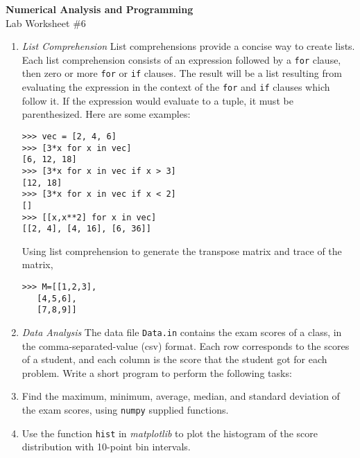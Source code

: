 \documentclass[12pt]{article}
\begin{document}
\begin{center}
\Large
\textbf{Numerical Analysis and Programming}\\
\large
Lab Worksheet \#6
\end{center}
\begin{enumerate}
\item \textit{List Comprehension}
List comprehensions provide a concise way to create lists. Each list comprehension consists of an expression followed by a  {\tt for} clause, then zero or more {\tt for} or {\tt if} clauses. The result will be a list resulting from evaluating the expression in the context of the  {\tt for} and {\tt if}  clauses which follow it. If the expression would evaluate to a tuple, it must be parenthesized. Here are some examples:
\small
\begin{verbatim}
>>> vec = [2, 4, 6]
>>> [3*x for x in vec]
[6, 12, 18]
>>> [3*x for x in vec if x > 3]
[12, 18]
>>> [3*x for x in vec if x < 2]
[]
>>> [[x,x**2] for x in vec]
[[2, 4], [4, 16], [6, 36]]
\end{verbatim}
\normalsize
Using list comprehension to generate the transpose matrix and trace of the matrix,
\small
\begin{verbatim}
>>> M=[[1,2,3],
   [4,5,6],
   [7,8,9]]
\end{verbatim}
\item \textit{Data Analysis} The data file \verb!Data.in! contains the exam scores of a class, in the comma-separated-value (csv) format.
Each row corresponds to the scores of a student, and each column is  the score that the student got for each problem. Write a short program to perform the following tasks:
\item Find the maximum, minimum, average, median, and standard deviation of the exam scores, using \verb!numpy! supplied functions.
\item Use the function \verb!hist! in \textit{matplotlib}  to plot the histogram of the score distribution with 10-point bin intervals.

\end{enumerate}
\end{document}

